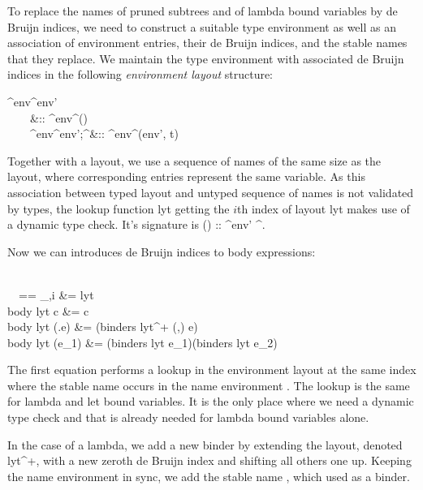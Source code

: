 To replace the names of pruned subtrees and of lambda bound variables by de Bruijn indices, we need to construct a suitable type environment as well as an association of environment entries, their de Bruijn indices, and the stable names that they replace. We maintain the type environment with associated de Bruijn indices in the following \emph{environment layout} structure:
%
\newcommand{\Lyt}[1][env]{{^{#1}\!\Delta}}
\begin{haskell}
  \Lyt^{env'}  \\
  ~~~~\circ &:: \Lyt^{()} \\
  ~~~~\Lyt^{env'};\idx^\tau &:: \Lyt^{(env', t)} \\
\end{haskell}
%
Together with a layout, we use a sequence of names \<\overline\nu\> of the same size as the layout, where corresponding entries represent the same variable. As this association between typed layout and untyped sequence of names is not validated by types, the lookup function \<lyt\mathrel{}\> getting the $i$th index of layout \<lyt\> makes use of a dynamic type check. It's signature is \<(\downarrow) ::  \to \Lyt^{env'} \to \idx^\tau\>.

Now we can introduces de Bruijn indices to body expressions:
%
\begin{haskell}
  \hsnoalign{body :: \Lyt^{env} \to \overline\nu \to \dT^\tau \to \iT^\tau}
   \\
    ~~\mid \nu == \nu_{\rho,i} &= lyt\mathrel{} \\
  body lyt \overline{\nu_\rho} c
    &= c \\
  body lyt \overline{\nu_\rho} (\lambda\nu.e)
    &= \lambda(binders lyt^+ (\nu,\overline{\nu_\rho}) e) \\
  body lyt \overline{\nu_\rho} (e_1)
    &= (binders lyt \overline{\nu_\rho} e_1)\app(binders lyt \overline{\nu_\rho} e_2)
\end{haskell}
%
The first equation performs a lookup in the environment layout at the same index where the stable name \<\nu\> occurs in the name environment \<\overline\nu\>. The lookup is the same for lambda and let bound variables. It is the only place where we need a dynamic type check and that is already needed for lambda bound variables alone.

In the case of a lambda, we add a new binder by extending the layout, denoted \<lyt^+\>, with a new zeroth de Bruijn index and shifting all others one up. Keeping the name environment in sync, we add the stable name \<\nu\>, which \<\dT\> used as a binder.

